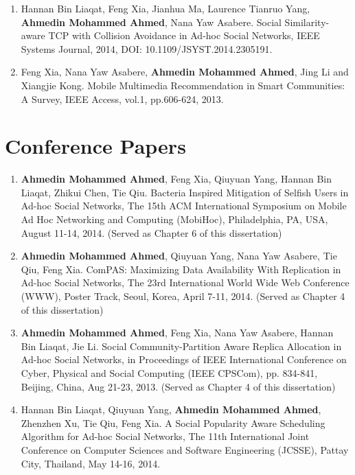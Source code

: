 \begin{enumerate}
\item
Hannan Bin Liaqat, Feng Xia, Jianhua Ma, Laurence Tianruo Yang, \textbf{Ahmedin Mohammed Ahmed}, Nana Yaw Asabere. Social Similarity-aware TCP with Collision Avoidance in Ad-hoc Social Networks, IEEE Systems Journal, 2014, DOI: 10.1109/JSYST.2014.2305191.

\item
Feng Xia, Nana Yaw Asabere, \textbf{Ahmedin Mohammed Ahmed}, Jing Li and Xiangjie Kong. Mobile Multimedia Recommendation in Smart Communities: A Survey, IEEE Access, vol.1, pp.606-624, 2013.

\end{enumerate}

\section*{Conference Papers}
\begin{enumerate}
\item
\textbf{Ahmedin Mohammed Ahmed}, Feng Xia, Qiuyuan Yang, Hannan Bin Liaqat, Zhikui Chen, Tie Qiu. Bacteria Inspired Mitigation of Selfish Users in Ad-hoc Social Networks, The 15th ACM International Symposium on Mobile Ad Hoc Networking and Computing (MobiHoc), Philadelphia, PA, USA, August 11-14, 2014. (Served as Chapter 6 of this dissertation)

\item
\textbf{Ahmedin Mohammed Ahmed}, Qiuyuan Yang, Nana Yaw Asabere, Tie Qiu, Feng Xia. ComPAS: Maximizing Data Availability With Replication in Ad-hoc Social Networks, The 23rd International World Wide Web Conference (WWW), Poster Track, Seoul, Korea, April 7-11, 2014. (Served as Chapter 4 of this dissertation)

\item
\textbf{Ahmedin Mohammed Ahmed}, Feng Xia, Nana Yaw Asabere, Hannan Bin Liaqat, Jie Li. Social Community-Partition Aware Replica Allocation in Ad-hoc Social Networks, in Proceedings of IEEE International Conference on Cyber, Physical and Social Computing (IEEE CPSCom), pp. 834-841, Beijing, China, Aug 21-23, 2013. (Served as Chapter 4 of this dissertation)

\item
Hannan Bin Liaqat, Qiuyuan Yang, \textbf{Ahmedin Mohammed Ahmed}, Zhenzhen Xu, Tie Qiu, Feng Xia. A Social Popularity Aware Scheduling Algorithm for Ad-hoc Social Networks, The 11th International Joint Conference on Computer Sciences and Software Engineering (JCSSE), Pattay City, Thailand, May 14-16, 2014.
\end{enumerate}

